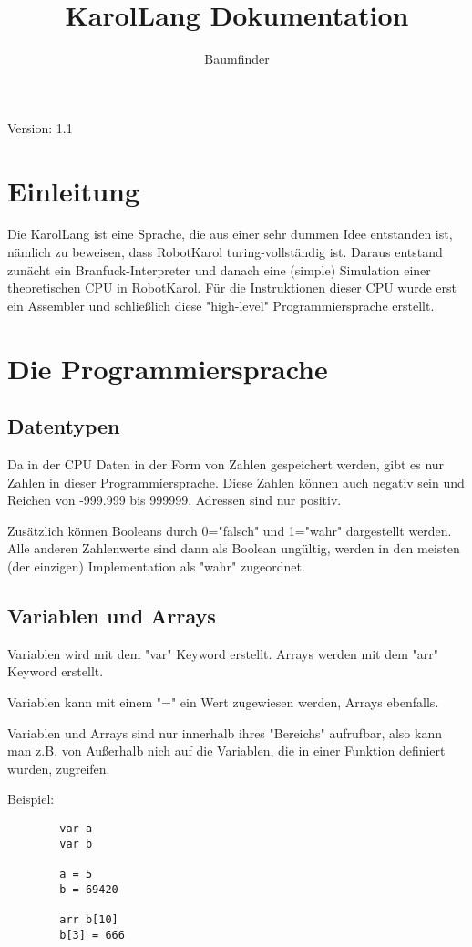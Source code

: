 \documentclass[ngerman]{article}
\title{KarolLang Dokumentation}
\author{Baumfinder}
\date{}
\begin{document}
    \maketitle

    Version: 1.1

    \section{Einleitung}
    Die KarolLang ist eine Sprache, die aus einer sehr dummen
    Idee entstanden ist, nämlich zu beweisen, dass RobotKarol
    turing-vollständig ist. Daraus entstand zunächt ein 
    Branfuck-Interpreter und danach eine (simple) Simulation
    einer theoretischen CPU in RobotKarol. Für die Instruktionen
    dieser CPU wurde erst ein Assembler und schließlich diese
    "high-level" Programmiersprache erstellt.

    \section{Die Programmiersprache}
    
    \subsection{Datentypen}
    Da in der CPU Daten in der Form von Zahlen gespeichert werden,
    gibt es nur Zahlen in dieser Programmiersprache. Diese Zahlen
    können auch negativ sein und Reichen von -999.999 bis 999999.
    Adressen sind nur positiv.
    
    Zusätzlich können Booleans durch 0="falsch" und 1="wahr"
    dargestellt werden. Alle anderen Zahlenwerte sind dann als
    Boolean ungültig, werden in den meisten (der einzigen)
    Implementation als "wahr" zugeordnet.

    \subsection{Variablen und Arrays}
    Variablen wird mit dem "var" Keyword erstellt. Arrays werden mit
    dem "arr" Keyword erstellt.

    Variablen kann mit einem "=" ein Wert zugewiesen werden, Arrays
    ebenfalls.

    Variablen und Arrays sind nur innerhalb ihres "Bereichs" aufrufbar,
    also kann man z.B. von Außerhalb nich auf die Variablen, die
    in einer Funktion definiert wurden, zugreifen.

    Beispiel:
    \begin{lstlisting}
        var a
        var b

        a = 5
        b = 69420

        arr b[10]
        b[3] = 666
    \end{lstlisting}
\end{document}
